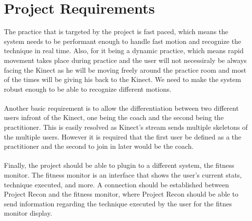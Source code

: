 \section{Project Requirements}
The practice that is targeted by the project is fast paced, which means the system needs to be performant enough to handle fast motion and recognize the technique in real time. Also, for it being a dynamic practice, which means rapid movement takes place during practice and the user will not necessiraly be always facing the Kinect as he will be moving freely around the practice room and most of the times will be giving his back to the Kinect. We need to make the system robust enough to be able to recognize different motions.
\\
\\
Another basic requirement is to allow the differentiation between two different users infront of the Kinect, one being the coach and the second being the practitioner. This is easily resolved as Kinect's stream sends multiple skeletons of the multiple users. However it is required that the first user be defined as a the practitioner and the second to join in later would be the coach.
\\
\\
Finally, the project should be able to plugin to a different system, the fitness monitor. The fitness monitor is an interface that shows the user's current stats, technique executed, and more. A connection should be established between Project Recon and the fitness monitor, where Project Recon should be able to send information regarding the technique executed by the user for the fitnes monitor display.
